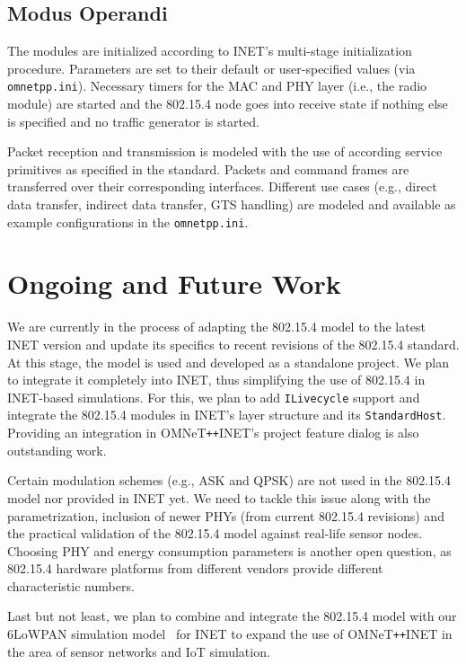 \documentclass[conference,10pt]{IEEEtran}
\newcommand{\omnetinet}{{OMNeT\texttt{++}INET}\xspace}
\begin{document}
\subsection*{Modus Operandi}
The modules are initialized according to INET's multi-stage initialization procedure.
Parameters are set to their default or user-specified values (via \texttt{omnetpp.ini}).
Necessary timers for the MAC and PHY layer (i.e., the radio module) are started and the 802.15.4 node goes into receive state if nothing else is specified and no traffic generator is started.
\par
Packet reception and transmission is modeled with the use of according service primitives as specified in the standard.
Packets and command frames are transferred over their corresponding interfaces.
Different use cases (e.g., direct data transfer, indirect data transfer, GTS handling) are modeled and available as example configurations in the \texttt{omnetpp.ini}.


\section{Ongoing and Future Work}
\label{sec:ongoing-work}
We are currently in the process of adapting the 802.15.4 model to the latest INET version and update its specifics to recent revisions of the 802.15.4 standard.
At this stage, the model is used and developed as a standalone project. 
We plan to integrate it completely into INET, thus simplifying the use of 802.15.4 in INET-based simulations.
For this, we plan to add \texttt{ILivecycle} support and integrate the 802.15.4 modules in INET's layer structure and its \texttt{StandardHost}.
Providing an integration in \omnetinet's project feature dialog is also outstanding work.
\par
Certain modulation schemes (e.g., ASK and QPSK) are not used in the 802.15.4 model nor provided in INET yet. 
We need to tackle this issue along with the parametrization, inclusion of newer PHYs (from current 802.15.4 revisions) and the practical validation of the 802.15.4 model against real-life sensor nodes.
Choosing PHY and energy consumption parameters is another open question, as 802.15.4 hardware platforms from different vendors provide different characteristic numbers.
\par
Last but not least, we plan to combine and integrate the 802.15.4 model with our 6LoWPAN simulation model~\cite{paper+kirsche-13:6lowpan-omnet} for INET to expand the use of \omnetinet in the area of sensor networks and IoT simulation.
\end{document}
